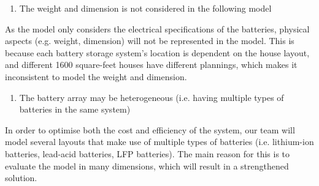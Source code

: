 \begin{enumerate}
    \item The weight and dimension is not considered in the following model
\end{enumerate}
As the model only considers the electrical specifications of the batteries, physical aspects (e.g. weight, dimension) will not be represented in the model. This is because each battery storage system's location is dependent on the house layout, and different 1600 square-feet houses have different plannings, which makes it inconsistent to model the weight and dimension.
\begin{enumerate}[resume]
    \item The battery array may be heterogeneous (i.e. having multiple types of batteries in the same system)
\end{enumerate}
In order to optimise both the cost and efficiency of the system, our team will model several layouts that make use of multiple types of batteries (i.e. lithium-ion batteries, lead-acid batteries, LFP batteries). The main reason for this is to evaluate the model in many dimensions, which will result in a strengthened solution.